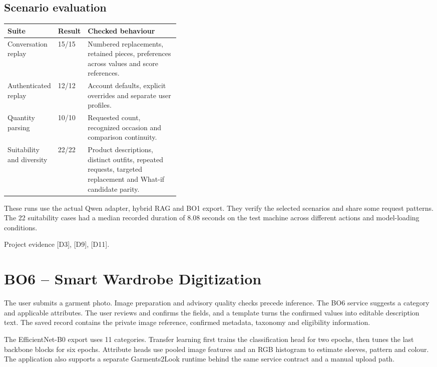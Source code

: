 \documentclass[11pt,a4paper]{article}
\newcommand{\src}[1]{\par{\footnotesize\textcolor{muted}{Project evidence #1.}}\par}
\begin{document}
\subsection*{Scenario evaluation}
\begin{tabularx}{\linewidth}{@{}L{0.26\linewidth}L{0.14\linewidth}Y@{}}
\toprule
\textbf{Suite} & \textbf{Result} & \textbf{Checked behaviour} \\
\midrule
Conversation replay & 15/15 & Numbered replacements, retained pieces, preferences across values and score references. \\
Authenticated replay & 12/12 & Account defaults, explicit overrides and separate user profiles. \\
Quantity parsing & 10/10 & Requested count, recognized occasion and comparison continuity. \\
Suitability and diversity & 22/22 & Product descriptions, distinct outfits, repeated requests, targeted replacement and What-if candidate parity. \\
\bottomrule
\end{tabularx}

These runs use the actual Qwen adapter, hybrid RAG and BO1 export. They verify the selected scenarios and share some request patterns. The 22 suitability cases had a median recorded duration of 8.08 seconds on the test machine across different actions and model-loading conditions.
\src{[D3], [D9], [D11]}

\clearpage
\section{BO6 -- Smart Wardrobe Digitization}
The user submits a garment photo. Image preparation and advisory quality checks precede inference. The BO6 service suggests a category and applicable attributes. The user reviews and confirms the fields, and a template turns the confirmed values into editable description text. The saved record contains the private image reference, confirmed metadata, taxonomy and eligibility information.

The EfficientNet-B0 export uses 11 categories. Transfer learning first trains the classification head for two epochs, then tunes the last backbone blocks for six epochs. Attribute heads use pooled image features and an RGB histogram to estimate sleeves, pattern and colour. The application also supports a separate Garments2Look runtime behind the same service contract and a manual upload path. \cite{tan2019}
\end{document}
